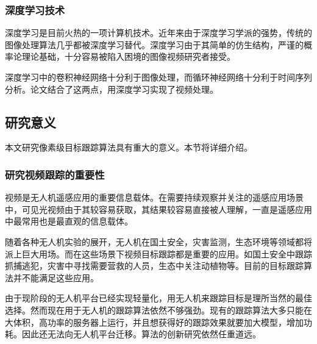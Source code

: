 \subsubsection{深度学习技术}
深度学习是目前火热的一项计算机技术。近年来由于深度学习学派的强势，传统的图像处理算法几乎都被深度学习替代。深度学习由于其简单的仿生结构，严谨的概率论理论基础，十分容易被陷入困境的图像视频研究者接受。
\par
深度学习中的卷积神经网络十分利于图像处理，而循环神经网络十分利于时间序列分析。论文结合了这两点，用深度学习实现了视频处理。

\subsection{研究意义}
本文研究像素级目标跟踪算法具有重大的意义。本节将详细介绍。

\subsubsection{研究视频跟踪的重要性}
视频是无人机遥感应用的重要信息载体。在需要持续观察并关注的遥感应用场景中，可见光视频由于其较容易获取，其结果较容易直接被人理解，一直是遥感应用中最常用也是最直观的信息载体。
\par
随着各种无人机实验的展开，无人机在国土安全，灾害监测，生态环境等领域都将派上巨大用场。而在这些场景下视频目标跟踪都是重要的应用。如国土安全中跟踪抓捕逃犯，灾害中寻找需要营救的人员，生态中关注动植物等。目前的目标跟踪算法并不能满足这些应用。
\par
由于现阶段的无人机平台已经实现轻量化，用无人机来跟踪目标是理所当然的最佳选择。然而现在用于无人机的跟踪算法依然不够强劲。现有的跟踪算法大多只能在大体积，高功率的服务器上运行，并且想获得好的跟踪效果就要加大模型，增加功耗。因此还无法向无人机平台迁移。算法的创新研究依然任重道远。

